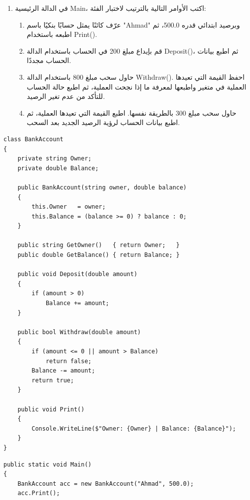 \documentclass[14pt]{extarticle}
\begin{document}
\begin{enumerate}[itemsep=2em]
\begin{enumerate}[itemsep=1em]
    \item في الدالة الرئيسية \textenglish{Main}، اكتب الأوامر التالية بالترتيب لاختبار الفئة:
    \begin{enumerate}[itemsep=1pt, label=(\roman*)]
        \item عرّف كائنًا يمثل حسابًا بنكيًا باسم \textenglish{"Ahmad"} وبرصيد ابتدائي قدره \textenglish{500.0}، ثم اطبعه باستخدام \textenglish{Print()}.
        \item قم بإيداع مبلغ \textenglish{200} في الحساب باستخدام الدالة \textenglish{Deposit()}، ثم اطبع بيانات الحساب مجددًا.
        \item حاول سحب مبلغ \textenglish{800} باستخدام الدالة \textenglish{Withdraw()}. احفظ القيمة التي تعيدها العملية في متغير واطبعها لمعرفة ما إذا نجحت العملية، ثم اطبع حالة الحساب للتأكد من عدم تغير الرصيد.
        \item حاول سحب مبلغ \textenglish{300} بالطريقة نفسها. اطبع القيمة التي تعيدها العملية، ثم اطبع بيانات الحساب لرؤية الرصيد الجديد بعد السحب.
    \end{enumerate}
\end{enumerate}

\ifwithsols
{\small
\begin{boxSolution}
\begin{english}
\begin{verbatim}
class BankAccount
{
    private string Owner;
    private double Balance;

    public BankAccount(string owner, double balance)
    {
        this.Owner   = owner;
        this.Balance = (balance >= 0) ? balance : 0;
    }

    public string GetOwner()   { return Owner;   }
    public double GetBalance() { return Balance; }

    public void Deposit(double amount)
    {
        if (amount > 0)
            Balance += amount;
    }

    public bool Withdraw(double amount)
    {
        if (amount <= 0 || amount > Balance)
            return false;
        Balance -= amount;
        return true;
    }

    public void Print()
    {
        Console.WriteLine($"Owner: {Owner} | Balance: {Balance}");
    }
}
\end{verbatim}
\end{english}
\end{boxSolution}
\begin{boxSolution}
\begin{english}
\begin{verbatim}
public static void Main()
{
    BankAccount acc = new BankAccount("Ahmad", 500.0);
    acc.Print();


\end{verbatim}
\end{english}
\end{boxSolution}}
\end{enumerate}
\end{document}
